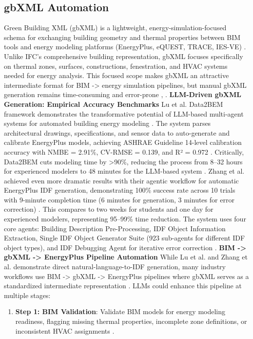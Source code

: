 \documentclass[12pt,a4paper]{article}
\begin{document}
\subsection{gbXML Automation}
Green Building XML (gbXML) is a lightweight, energy-simulation-focused schema for exchanging building geometry and thermal properties between BIM tools and energy modeling platforms (EnergyPlus, eQUEST, TRACE, IES-VE) \cite{ref67}. Unlike IFC's comprehensive building representation, gbXML focuses specifically on thermal zones, surfaces, constructions, fenestration, and HVAC systems needed for energy analysis. This focused scope makes gbXML an attractive intermediate format for BIM -> energy simulation pipelines, but manual gbXML generation remains time-consuming and error-prone \cite{ref36}, \cite{ref123}.
\textbf{LLM-Driven gbXML Generation: Empirical Accuracy Benchmarks}
Lu et al. Data2BEM framework demonstrates the transformative potential of LLM-based multi-agent systems for automated building energy modeling \cite{ref36}. The system parses architectural drawings, specifications, and sensor data to auto-generate and calibrate EnergyPlus models, achieving ASHRAE Guideline 14-level calibration accuracy with NMBE = 2.91\%, CV-RMSE = 0.139, and R² = 0.972 \cite{ref36}. Critically, Data2BEM cuts modeling time by >90\%, reducing the process from 8--32 hours for experienced modelers to 48 minutes for the LLM-based system \cite{ref36}.
Zhang et al. achieved even more dramatic results with their agentic workflow for automatic EnergyPlus IDF generation, demonstrating 100\% success rate across 10 trials with 9-minute completion time (6 minutes for generation, 3 minutes for error correction) \cite{ref123}. This compares to two weeks for students and one day for experienced modelers, representing 95--99\% time reduction. The system uses four core agents: Building Description Pre-Processing, IDF Object Information Extraction, Single IDF Object Generator Suite (923 sub-agents for different IDF object types), and IDF Debugging Agent for iterative error correction \cite{ref123}.
\textbf{BIM -> gbXML -> EnergyPlus Pipeline Automation}
While Lu et al. and Zhang et al. demonstrate direct natural-language-to-IDF generation, many industry workflows use BIM -> gbXML -> EnergyPlus pipelines where gbXML serves as a standardized intermediate representation \cite{ref67}. LLMs could enhance this pipeline at multiple stages:
\begin{enumerate}
  \item \textbf{Step 1: BIM Validation}: Validate BIM models for energy modeling readiness, flagging missing thermal properties, incomplete zone definitions, or inconsistent HVAC assignments \cite{ref123}.
\end{enumerate}
\end{document}
